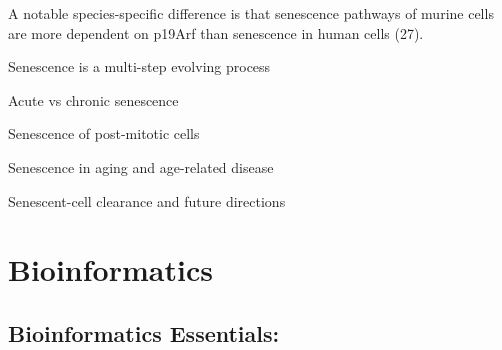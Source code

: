 \documentclass[
]{book}
\begin{document}
A notable species-specific difference is that senescence pathways of murine cells are more dependent on p19Arf than senescence in human cells (27).

Senescence is a multi-step evolving process

Acute vs chronic senescence

Senescence of post-mitotic cells

Senescence in aging and age-related disease

Senescent-cell clearance and future directions

\hypertarget{bioinformatics}{%
\chapter{Bioinformatics}\label{bioinformatics}}

\hypertarget{bioinformatics-essentials}{%
\section{Bioinformatics Essentials:}\label{bioinformatics-essentials}}
\end{document}
